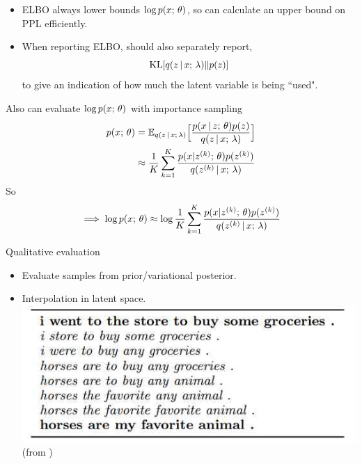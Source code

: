 \begin{frame}
\begin{itemize}
    \item ELBO always lower bounds $\log p(x ; \, \theta)$, so can calculate an upper bound on PPL efficiently.
    \item When reporting ELBO, should also separately report,
    \[ \operatorname*{KL}[q(z \,|\, x ; \, \lambda) \Vert p(z)] \] 
    to give an indication of how much the latent variable is being ``used".
\end{itemize}
\end{frame} 

\begin{frame}
    
    Also can evaluate $\log p(x ; \, \theta)$ with importance sampling
    \begin{align*}
        p(x ; \, \theta) &= \mathbb{E}_{q(z \,|\, x ; \, \lambda)}\Big[\frac{p(x \,|\, z ; \, \theta)p(z)}{q(z \,|\, x ; \, \lambda)}\Big] \\
        &\approx \frac{1}{K}\sum_{k=1}^K \frac{p(x | z^{(k)} ; \, \theta)p(z^{(k)})}{q(z^{(k)} \,|\, x ; \, \lambda)}
    \end{align*}
    So 
    \[ 
    \implies \log p(x ; \, \theta) \approx \log \frac{1}{K}\sum_{k=1}^K \frac{p(x | z^{(k)} ; \, \theta)p(z^{(k)})}{q(z^{(k)} \,|\, x ; \, \lambda)}
\]
\end{frame} 

\begin{frame}
Qualitative evaluation 
\begin{itemize}
    \item Evaluate samples from prior/variational posterior. 
    \item Interpolation in latent space. 
\center
\includegraphics[scale=0.5]{pics/zinterp.jpg} \\
(from \cite{Bowman2016})
\end{itemize}
\end{frame} 

